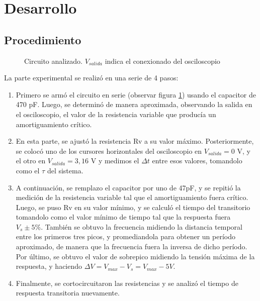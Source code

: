 \documentclass{article}
\begin{document}
\section{Desarrollo}
    \subsection{Procedimiento}

\begin{figure}[H]
    \centering
    \caption{Circuito analizado. $V_{salida}$ indica el conexionado del osciloscopio}
    \label{fig: circuito_rlc}
\end{figure}


    La parte experimental se realizó en una serie de 4 pasos:

    \begin{enumerate}
        \item Primero se armó el circuito en serie (observar figura \ref{fig: circuito_rlc}) usando el capacitor de 470 pF. Luego, se determinó de manera aproximada, observando la salida en el osciloscopio, el valor de la resistencia variable que producía un amortiguamiento crítico.
        \item En esta parte, se ajustó la resistencia Rv a su valor máximo. Posteriormente, se colocó uno de los cursores horizontales del osciloscopio en $ V_{salida}=0$ V, y el otro en $ V_{salida}=3,16$ V y medimos el $ \Delta t $ entre esos valores, tomandolo como el $\tau$ del sistema.
        \item A continuación, se remplazo el capacitor por uno de 47pF, y se repitió la medición de la resistencia variable tal que el amortiguamiento fuera crítico. Luego, se puso Rv en su valor mínimo, y se calculó el tiempo del transitorio tomandolo como el valor mínimo de tiempo tal que la respuesta fuera $V_s \pm 5\% $. También se obtuvo la frecuencia midiendo la distancia temporal entre los primeros tres picos, y promediandola para obtener un período aproximado, de manera que la frecuencia fuera la inversa de dicho período. Por último, se obtuvo el valor de sobrepico midiendo la tensión máxima de la respuesta, y haciendo $ \Delta V = V_{max} - V_s = V_{max} - 5 V $.
        \item Finalmente, se cortocircuitaron las resistencias y se analizó el tiempo de respuesta transitoria nuevamente.
        
    \end{enumerate}
\end{document}
